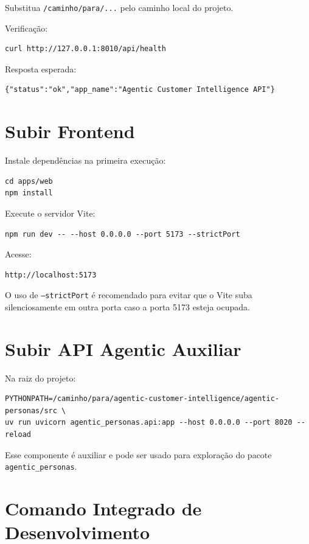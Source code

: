 \documentclass[12pt,a4paper]{article}
\begin{document}
Substitua \texttt{/caminho/para/...} pelo caminho local do projeto.

Verificação:

\begin{verbatim}
curl http://127.0.0.1:8010/api/health
\end{verbatim}

Resposta esperada:

\begin{verbatim}
{"status":"ok","app_name":"Agentic Customer Intelligence API"}
\end{verbatim}

\section{Subir Frontend}

Instale dependências na primeira execução:

\begin{verbatim}
cd apps/web
npm install
\end{verbatim}

Execute o servidor Vite:

\begin{verbatim}
npm run dev -- --host 0.0.0.0 --port 5173 --strictPort
\end{verbatim}

Acesse:

\begin{verbatim}
http://localhost:5173
\end{verbatim}

O uso de \texttt{--strictPort} é recomendado para evitar que o Vite suba silenciosamente em outra porta caso a porta 5173 esteja ocupada.

\section{Subir API Agentic Auxiliar}

Na raiz do projeto:

\begin{verbatim}
PYTHONPATH=/caminho/para/agentic-customer-intelligence/agentic-personas/src \
uv run uvicorn agentic_personas.api:app --host 0.0.0.0 --port 8020 --reload
\end{verbatim}

Esse componente é auxiliar e pode ser usado para exploração do pacote \texttt{agentic\_personas}.

\section{Comando Integrado de Desenvolvimento}
\end{document}
